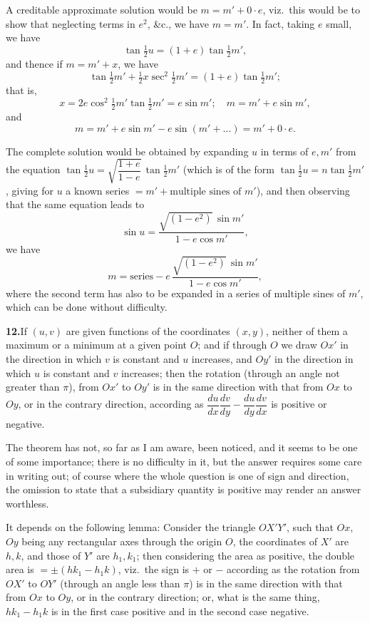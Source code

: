 \documentclass[11pt]{article}
\begin{document}
A creditable approximate solution would be $m=m'+0\cdot e$, viz.\ this would be to
show that neglecting terms in $e^{2}$, \&c., we have $m=m'$. In fact, taking $e$ small,
we have
\[
\tan\tfrac{1}{2}u=(1+e)\tan\tfrac{1}{2}m',
\]
and thence if $m=m'+x$, we have
\[
\tan\tfrac{1}{2}m'+\tfrac{1}{2}x\sec^{2}\tfrac{1}{2}m'=(1+e)\tan\tfrac{1}{2}m';
\]
that is,
\[
x=2e\cos^{2}\tfrac{1}{2}m'\tan\tfrac{1}{2}m'=e\sin m';\quad m=m'+e\sin m',
\]
and
\[
m=m'+e\sin m'-e\sin(m'+\ldots)=m'+0\cdot e.
\]

The complete solution would be obtained by expanding $u$ in terms of $e,m'$ from the
equation $\tan\tfrac{1}{2}u=\sqrt{\dfrac{1+e}{1-e}}\,\tan\tfrac{1}{2}m'$ (which is of the form
$\tan\tfrac{1}{2}u=n\tan\tfrac{1}{2}m'$, giving for $u$ a known series $=m'+\text{multiple sines of }m'$), and
then observing that the same equation leads to
\[
\sin u=\frac{\sqrt{(1-e^{2})}\,\sin m'}{1-e\cos m'},
\]
we have
\[
m=\text{series}-e\,\frac{\sqrt{(1-e^{2})}\,\sin m'}{1-e\cos m'},
\]
where the second term has also to be expanded in a series of multiple sines of $m'$,
which can be done without difficulty.

\medskip
\noindent\textbf{12.}\quad If $(u,v)$ are given functions of the coordinates $(x,y)$,
neither of them a maximum or a minimum at a given point $O$; and if through $O$ we
draw $Ox'$ in the direction in which $v$ is constant and $u$ increases, and $Oy'$ in the
direction in which $u$ is constant and $v$ increases; then the rotation (through an
angle not greater than $\pi$), from $Ox'$ to $Oy'$ is in the same direction with that
from $Ox$ to $Oy$, or in the contrary direction, according as
$\dfrac{du}{dx}\dfrac{dv}{dy}-\dfrac{du}{dy}\dfrac{dv}{dx}$ is positive or negative.

\medskip
The theorem has not, so far as I am aware, been noticed, and it seems to be one of
some importance; there is no difficulty in it, but the answer requires some care in
writing out; of course where the whole question is one of sign and direction, the
omission to state that a subsidiary quantity is positive may render an answer worthless.

It depends on the following lemma: Consider the triangle $OX'Y'$, such that $Ox$,
$Oy$ being any rectangular axes through the origin $O$, the coordinates of $X'$ are
$h,k$, and those of $Y'$ are $h_{1},k_{1}$; then considering the area as positive, the
double area is $=\pm(hk_{1}-h_{1}k)$, viz.\ the sign is $+$ or $-$ according as the rotation
from $OX'$ to $OY'$ (through an angle less than $\pi$) is in the same direction with that
from $Ox$ to $Oy$, or in the contrary direction; or, what is the same thing, $hk_{1}-h_{1}k$
is in the first case positive and in the second case negative.
\end{document}
